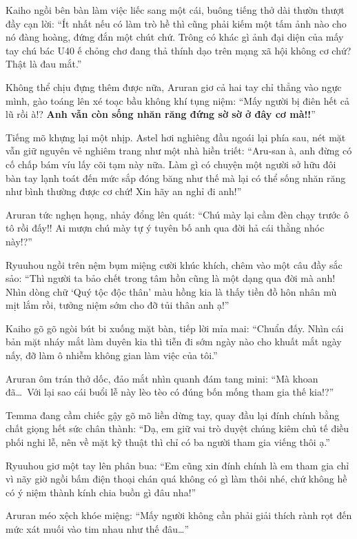 \documentclass[../main.tex]{subfiles}
\begin{document}
Kaiho ngồi bên bàn làm việc liếc sang một cái, buông tiếng thở dài thườn thượt đầy cạn lời: ``Ít nhất nếu có làm trò hề thì cũng phải kiếm một tấm ảnh nào cho nó đàng hoàng, đứng đắn một chút chứ. Trông có khác gì ảnh đại diện của mấy tay chú bác U40 ế chỏng chơ đang thả thính dạo trên mạng xã hội không cơ chứ? Thật là đau mắt.''

Không thể chịu đựng thêm được nữa, Aruran giơ cả hai tay chỉ thẳng vào ngực mình, gào toáng lên xé toạc bầu không khí tụng niệm: ``Mấy người bị điên hết cả lũ rồi à!? \textbf{Anh vẫn còn sống nhăn răng đứng sờ sờ ở đây cơ mà!!}''

Tiếng mõ khựng lại một nhịp. Astel hơi nghiêng đầu ngoái lại phía sau, nét mặt vẫn giữ nguyên vẻ nghiêm trang như một nhà hiền triết: ``Aru-san à, anh đừng có cố chấp bám víu lấy cõi tạm này nữa. Làm gì có chuyện một người sở hữu đôi bàn tay lạnh toát đến mức sắp đóng băng như thế mà lại có thể sống nhăn răng như bình thường được cơ chứ! Xin hãy an nghỉ đi anh!''

Aruran tức nghẹn họng, nhảy đổng lên quát: ``Chú mày lại cầm đèn chạy trước ô tô rồi đấy!! Ai mượn chú mày tự ý tuyên bố anh qua đời hả cái thằng nhóc này!?''

Ryuuhou ngồi trên nệm bụm miệng cười khúc khích, chêm vào một câu đầy sắc sảo: ``Thì người ta bảo chết trong tâm hồn cũng là một dạng qua đời mà anh! Nhìn dòng chữ `Quý tộc độc thân' màu hồng kia là thấy tiền đồ hôn nhân mù mịt lắm rồi, tưởng niệm sớm cho đỡ tủi thân anh ạ!''

Kaiho gõ gõ ngòi bút bi xuống mặt bàn, tiếp lời mỉa mai: ``Chuẩn đấy. Nhìn cái bản mặt nháy mắt làm duyên kia thì tiễn đi sớm ngày nào cho khuất mắt ngày nấy, đỡ làm ô nhiễm không gian làm việc của tôi.''

Aruran ôm trán thở dốc, đảo mắt nhìn quanh đám tang mini: ``Mà khoan đã\dots\ Với lại sao cái buổi lễ này lèo tèo có đúng bốn mống tham gia thế kia!?''

Temma đang cầm chiếc gậy gõ mõ liền dừng tay, quay đầu lại đính chính bằng chất giọng hết sức chân thành: ``Dạ, em giữ vai trò duyệt chúng kiêm chủ tế điều phối nghi lễ, nên về mặt kỹ thuật thì chỉ có ba người tham gia viếng thôi ạ.''

Ryuuhou giơ một tay lên phân bua: ``Em cũng xin đính chính là em tham gia chỉ vì nãy giờ ngồi bấm điện thoại chán quá không có gì làm thôi nhé, chứ không hề có ý niệm thành kính chia buồn gì đâu nha!''

Aruran méo xệch khóe miệng: ``Mấy người không cần phải giải thích rành rọt đến mức xát muối vào tim nhau như thế đâu\dots''
\end{document}
